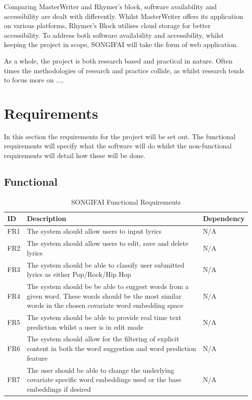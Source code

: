 \noindent
\newline
Comparing MasterWriter and Rhymer's block, software availability and accessibility are dealt with differently. Whilst MasterWriter offers its application on various platforms, Rhymer's Block utilises cloud storage for better accessibility. To address both software availability and accessibility, whilst keeping the project in scope, SONGIFAI will take the form of web application.  

\noindent
\newline
As a whole, the project is both research based and practical in nature. Often times the methodologies of research and practice collide, as whilst research tends to focus more on ..., 

\section{Requirements}
In this section the requirements for the project will be set out. The functional requirements will specify what the software will do whilst the non-functional requirements will detail how these will be done.

\subsection{Functional}
\begin{table}[ht]
	\caption{SONGIFAI Functional Requirements}
	\centering
	\begin{tabular}{ | l | p{10cm} | l | }
		\hline
		\textbf{ID} & \textbf{Description} & \textbf{Dependency} \\ \hline
		FR1 & The system should allow users to input lyrics & N/A \\ \hline
		FR2 & The system should allow users to edit, save and delete lyrics & N/A  \\ \hline
		FR3 & The system should be able to classify user submitted lyrics as either Pop/Rock/Hip Hop & N/A \\ \hline
		FR4 & The system should be be able to suggest words from a given word. These words should be the most similar words in the chosen covariate word embedding space & N/A \\ \hline
		FR5 & The system should be able to provide real time text prediction whilst a user is in edit mode & N/A \\ \hline
		FR6 & The system should allow for the filtering of explicit content in both the word suggestion and word prediction feature & N/A \\ \hline
		FR7 & The user should be able to change the underlying covariate specific word embeddings used or the base embeddings if desired& N/A \\ \hline
	\end{tabular}
	\label{Tab:Tcru}
\end{table}
